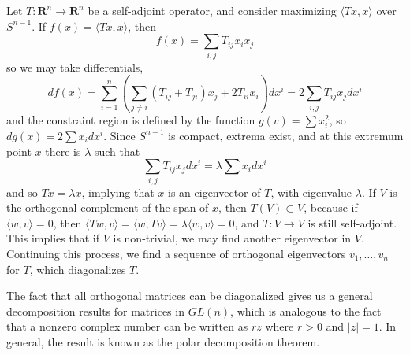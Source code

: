 \begin{example}
    Let $T: \mathbf{R}^n \to \mathbf{R}^n$ be a self-adjoint operator, and consider maximizing $\langle Tx, x \rangle$ over $S^{n-1}$. If $f(x) = \langle Tx, x \rangle$, then
    \[ f(x) = \sum_{i,j} T_{ij} x_i x_j \]
    so we may take differentials,
    \[ df(x) = \sum_{i = 1}^n \left( \sum_{j \neq i} (T_{ij} + T_{ji}) x_j + 2 T_{ii} x_i \right) dx^i = 2 \sum_{i,j} T_{ij} x_j dx^i \]
    and the constraint region is defined by the function $g(v) = \sum x_i^2$, so $dg(x) = 2 \sum x_i dx^i$. Since $S^{n-1}$ is compact, extrema exist, and at this extremum point $x$ there is $\lambda$ such that
    \[ \sum_{i,j} T_{ij} x_j dx^i = \lambda \sum x_i dx^i \]
    and so $Tx = \lambda x$, implying that $x$ is an eigenvector of $T$, with eigenvalue $\lambda$. If $V$ is the orthogonal complement of the span of $x$, then $T(V) \subset V$, because if $\langle w, v \rangle = 0$, then $\langle Tw, v \rangle = \langle w, Tv \rangle = \lambda \langle w, v \rangle = 0$, and $T: V \to V$ is still self-adjoint. This implies that if $V$ is non-trivial, we may find another eigenvector in $V$. Continuing this process, we find a sequence of orthogonal eigenvectors $v_1, \dots, v_n$ for $T$, which diagonalizes $T$.
\end{example}

The fact that all orthogonal matrices can be diagonalized gives us a general decomposition results for matrices in $GL(n)$, which is analogous to the fact that a nonzero complex number can be written as $rz$ where $r > 0$ and $|z| = 1$. In general, the result is known as the polar decomposition theorem.

